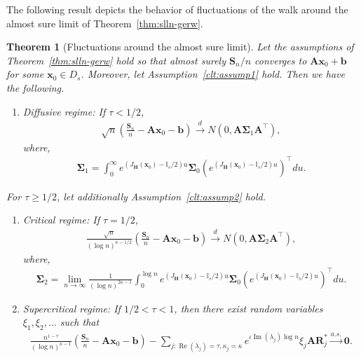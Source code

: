 \documentclass[12pt]{amsart}
\theoremstyle{plain}
\newtheorem{theorem}{Theorem}[section]
\theoremstyle{remark}
\numberwithin{equation}{section}
\begin{document}
The following result depicts the behavior of ﬂuctuations of the walk around the almost sure
limit of Theorem~\ref{thm:slln-gerw}. 

\begin{theorem}[Fluctuations around the almost sure limit]\label{thm:clt-gerw}
Let the assumptions of Theorem~\ref{thm:slln-gerw} hold so that almost surely ${\boldsymbol{S}_n}/{n}$ converges to $\boldsymbol{A}\boldsymbol{x}_0 + \boldsymbol{b}$ for some $\boldsymbol{x}_0 \in {D}_s$. Moreover, let Assumption~\ref{clt:assump1} hold. Then we have the following.

\begin{enumerate}
\item[a)] Diffusive regime: If $\tau < {1}/{2}$, 
\begin{align}\label{eq:diffconv}
    \sqrt{n}\left(\frac{\boldsymbol{S}_n}{n} - \boldsymbol{A}\boldsymbol{x}_0 - \boldsymbol{b}\right) \stackrel{d}{\to} N\left(0,\boldsymbol{A}\boldsymbol{\Sigma}_1\boldsymbol{A}^{\top}\right),
\end{align}
where,
\begin{align}\label{eq:sigma1}
   \boldsymbol{\Sigma}_1 = \int_{0}^{\infty}e^{\left(J_{\boldsymbol{H}}\left(\boldsymbol{x}_0\right) -\mathbb{I}_s/2\right)u}\boldsymbol{\Sigma}_0\left(e^{\left(J_{\boldsymbol{H}}\left(\boldsymbol{x}_0\right) -\mathbb{I}_s/2\right)u}\right)^{\top} du.
\end{align}
\end{enumerate}

For $\tau \geq 1/2$, let additionally Assumption~\ref{clt:assump2} hold.

\begin{enumerate}
\item[b)] Critical regime: If $\tau = {1}/{2}$, 
\begin{align}\label{eq:cricconv}
    \frac{\sqrt{n}}{(\log n)^{{\kappa} - 1/2}}\left(\frac{\boldsymbol{S}_n}{n} - \boldsymbol{A}\boldsymbol{x}_0 - \boldsymbol{b}\right) \stackrel{d}{\to} N\left(0,\boldsymbol{A}\boldsymbol{\Sigma}_2\boldsymbol{A}^{\top}\right),
\end{align}
where,
\begin{align}\label{eq:sigma2}
   \boldsymbol{\Sigma}_2 = \lim_{n\to\infty}\frac{1}{(\log n)^{2\kappa - 1}}\int_{0}^{\log n}e^{\left(J_{\boldsymbol{H}}\left(\boldsymbol{x}_0\right) -\mathbb{I}_s/2\right)u}\boldsymbol{\Sigma}_0\left(e^{\left(J_{\boldsymbol{H}}\left(\boldsymbol{x}_0\right) -\mathbb{I}_s/2\right)u}\right)^{\top} du.
\end{align}
\item[c)] Supercritical regime: If $1/2 < \tau < 1$, 
then there exist random variables ${\xi}_1, {\xi}_2, \ldots$ such that
\begin{align}\label{eq:sdiffconv}
    \frac{n^{1-\tau}}{(\log n)^{{\kappa} - 1}}\left(\frac{\boldsymbol{S}_n}{n} - \boldsymbol{A}\boldsymbol{x}_0 - \boldsymbol{b}\right) - \sum_{j : \operatorname{Re}\left(\lambda_j\right) = \tau, \kappa_j = \kappa}e^{\iota\operatorname{Im}\left(\lambda_j\right)\log n}{\xi}_j\boldsymbol{A}\boldsymbol{R}^*_{j} \stackrel{a.s.}{\to} \boldsymbol{0}.
\end{align}
\end{enumerate}
\end{theorem}
\end{document}
